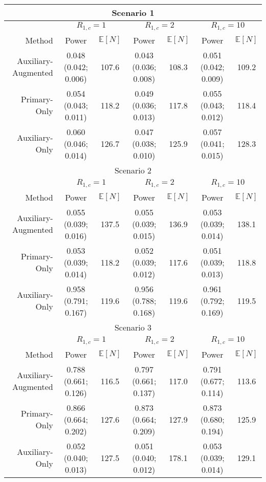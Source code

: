 \begin{tabular}{r|cc|cc|cc} 
\toprule 
\multicolumn{7}{c}{Scenario 1}\\ 
\midrule 
& \multicolumn{2}{c}{$R_{1,c}= 1$} & \multicolumn{2}{c}{$R_{1,c} = 2$} & \multicolumn{2}{c}{$R_{1,c} = 10$} \\ 
Method &  Power &   $\mathbb E[N]$ &
               Power &   $\mathbb E[N]$ &
               Power &   $\mathbb E[N]$  \\ 
Auxiliary-Augmented &0.048  (0.042; 0.006) & 107.6 &0.043  (0.036; 0.008) & 108.3 &0.051  (0.042; 0.009) & 109.2 \\ 
Primary-Only &0.054  (0.043; 0.011) & 118.2 &0.049  (0.036; 0.013) & 117.8 &0.055  (0.043; 0.012) & 118.4 \\ 
Auxiliary-Only &0.060  (0.046; 0.014) & 126.7 &0.047  (0.038; 0.010) & 125.9 &0.057  (0.041; 0.015) & 128.3 \\ 
\bottomrule 
\multicolumn{7}{c}{Scenario 2}\\ 
\midrule 
& \multicolumn{2}{c}{$R_{1,c}= 1$} & \multicolumn{2}{c}{$R_{1,c} = 2$} & \multicolumn{2}{c}{$R_{1,c} = 10$} \\ 
Method &  Power &   $\mathbb E[N]$ &
               Power &   $\mathbb E[N]$ &
               Power &   $\mathbb E[N]$  \\ 
Auxiliary-Augmented &0.055  (0.039; 0.016) & 137.5 &0.055  (0.039; 0.015) & 136.9 &0.053  (0.039; 0.014) & 138.1 \\ 
Primary-Only &0.053  (0.039; 0.014) & 118.2 &0.052  (0.039; 0.012) & 117.6 &0.051  (0.039; 0.013) & 118.8 \\ 
Auxiliary-Only &0.958  (0.791; 0.167) & 119.6 &0.956  (0.788; 0.168) & 119.6 &0.961  (0.792; 0.169) & 119.5 \\ 
\bottomrule 
\multicolumn{7}{c}{Scenario 3}\\ 
\midrule 
& \multicolumn{2}{c}{$R_{1,c}= 1$} & \multicolumn{2}{c}{$R_{1,c} = 2$} & \multicolumn{2}{c}{$R_{1,c} = 10$} \\ 
Method &  Power &   $\mathbb E[N]$ &
               Power &   $\mathbb E[N]$ &
               Power &   $\mathbb E[N]$  \\ 
Auxiliary-Augmented &0.788  (0.661; 0.126) & 116.5 &0.797  (0.661; 0.137) & 117.0 &0.791  (0.677; 0.114) & 113.6 \\ 
Primary-Only &0.866  (0.664; 0.202) & 127.6 &0.873  (0.664; 0.209) & 127.9 &0.873  (0.680; 0.194) & 125.9 \\ 
Auxiliary-Only &0.052  (0.040; 0.013) & 127.5 &0.051  (0.040; 0.012) & 178.1 &0.053  (0.039; 0.014) & 129.1 \\ 

\end{tabular}
